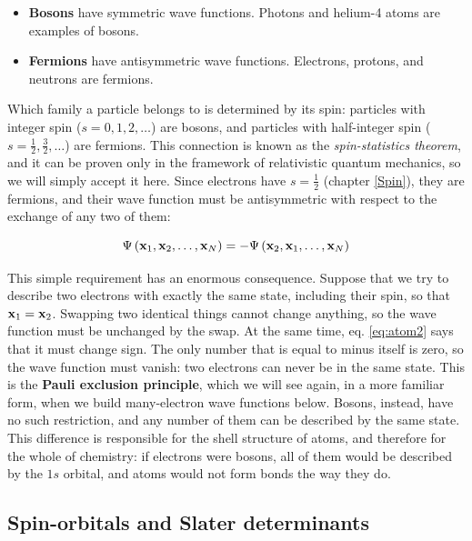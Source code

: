 \documentclass[
  english,
  9pt,
]{extbook}
\providecommand{\tightlist}{%
  \setlength{\itemsep}{0pt}\setlength{\parskip}{0pt}}
\theoremstyle{definition}
\theoremstyle{definition}
\theoremstyle{definition}
\theoremstyle{definition}
\theoremstyle{remark}
\begin{document}
\begin{itemize}
\tightlist
\item
  \textbf{Bosons} have symmetric wave functions. Photons and helium-4 atoms are examples of bosons.
\item
  \textbf{Fermions} have antisymmetric wave functions. Electrons, protons, and neutrons are fermions.
\end{itemize}

Which family a particle belongs to is determined by its spin: particles with integer spin (\(s=0,1,2,\ldots\)) are bosons, and particles with half-integer spin (\(s=\frac{1}{2},\frac{3}{2},\ldots\)) are fermions. This connection is known as the \emph{spin-statistics theorem}, and it can be proven only in the framework of relativistic quantum mechanics, so we will simply accept it here. Since electrons have \(s=\frac{1}{2}\) (chapter \ref{Spin}), they are fermions, and their wave function must be antisymmetric with respect to the exchange of any two of them:

\begin{equation}
\Psi\left({\bf x}_1,{\bf x}_2,\ldots, {\bf x}_N\right) = - \Psi\left({\bf x}_2,{\bf x}_1,\ldots, {\bf x}_N\right)
\label{eq:atom2}
\end{equation}

This simple requirement has an enormous consequence. Suppose that we try to describe two electrons with exactly the same state, including their spin, so that \({\bf x}_1={\bf x}_2\). Swapping two identical things cannot change anything, so the wave function must be unchanged by the swap. At the same time, eq. \eqref{eq:atom2} says that it must change sign. The only number that is equal to minus itself is zero, so the wave function must vanish: two electrons can never be in the same state. This is the \textbf{Pauli exclusion principle}, which we will see again, in a more familiar form, when we build many-electron wave functions below. Bosons, instead, have no such restriction, and any number of them can be described by the same state. This difference is responsible for the shell structure of atoms, and therefore for the whole of chemistry: if electrons were bosons, all of them would be described by the \(1s\) orbital, and atoms would not form bonds the way they do.

\subsection{Spin-orbitals and Slater determinants}\label{spin-orbitals-and-slater-determinants}
\end{document}
